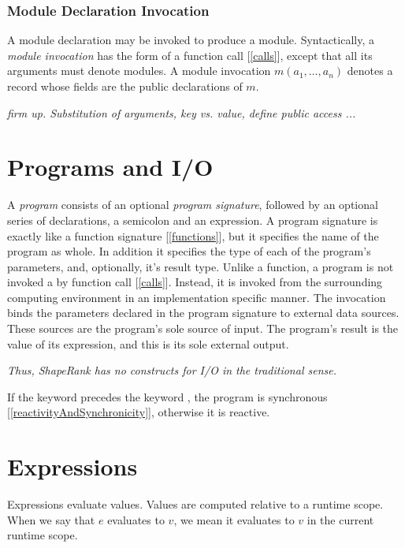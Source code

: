 \documentclass{article}
\begin{document}
\subsubsection{Module Declaration Invocation}
\label{moduleDeclarationInvocation}

A module declaration may be invoked to produce a module. Syntactically, a {\em module invocation} has the form of a function call [\ref{calls}], except that all its arguments must denote modules.
A module invocation $m(a_1, \ldots, a_n)$ denotes a record whose fields are the public declarations of $m$.

{\em firm up. Substitution of arguments, key vs. value, define public access ...}

\section{Programs and I/O}
\label{programsAndIO}

A {\em program} consists of an optional  {\em program signature}, followed by an optional  series of declarations, a semicolon and an expression.
A program signature is exactly like a function signature [\ref{functions}], but it specifies the name of the program as whole. In addition it specifies the type of each of the program's parameters, and, optionally, it's result type.  Unlike a function, a program is not invoked a by function call [\ref{calls}]. Instead, it is invoked from the surrounding computing environment in an implementation specific manner.  The invocation binds the parameters declared in the program signature to external data sources. These sources are the program's sole source of input. The program's result is the value of its expression, and this is its sole external output. 

{\em 
Thus, ShapeRank has no constructs for I/O in the traditional sense.
}

If the keyword \SYNC precedes the keyword \PROGRAM, the program is synchronous [\ref{reactivityAndSynchronicity}], otherwise it is reactive.



\section{Expressions}
\label{expressions}

Expressions evaluate values. Values are computed relative to a runtime scope. When we say that $e$ evaluates to $v$, we mean it evaluates to $v$ in the current runtime scope. 
\end{document}
